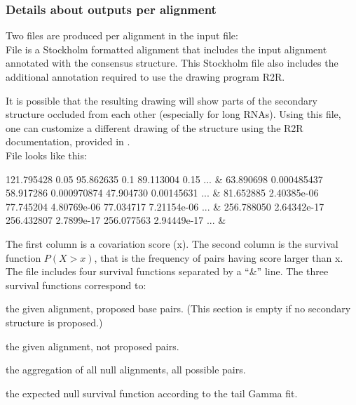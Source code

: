 \subsubsection{Details about outputs per alignment}
 Two files are produced per alignment in the input file: \\

 File  is a Stockholm
 formatted alignment that includes the input alignment annotated with
 the consensus structure. This Stockholm file also includes the
 additional annotation required to use the drawing program R2R.

 It is possible that the resulting drawing will show parts of the
 secondary structure occluded from each other (especially for long
 RNAs).  Using this file, one can customize a different drawing of the
 structure using the R2R documentation, provided in
 .\\

 File  looks like this:

 \begin{sreoutput}
121.795428      0.05
95.862635       0.1
89.113004       0.15
...
 &
63.890698       0.000485437
58.917286       0.000970874
47.904730       0.00145631
...
 &
81.652885       2.40385e-06
77.745204       4.80769e-06
77.034717       7.21154e-06
...
 &
256.788050      2.64342e-17
256.432807      2.7899e-17
256.077563      2.94449e-17
...
 &
 \end{sreoutput}
 The first column is a covariation score (x). The second column is the
 survival function $P(X > x)$, that is the frequency of pairs having
 score larger than x. The file includes four survival functions separated by a
 ``\&'' line. The three survival functions correspond to:

 \begin{sreitems}{}
 \item[\prog{First functions:}] the given alignment, proposed base pairs.
 (This section is empty if no secondary structure is proposed.)
 \item[\prog{Second functions:}] the given alignment, not proposed pairs.
 \item[\prog{Third function:}] the aggregation of all null alignments, all possible pairs.
 \item[\prog{Fourth function:}] the expected null survival function according to the tail Gamma fit.
 \end{sreitems}


